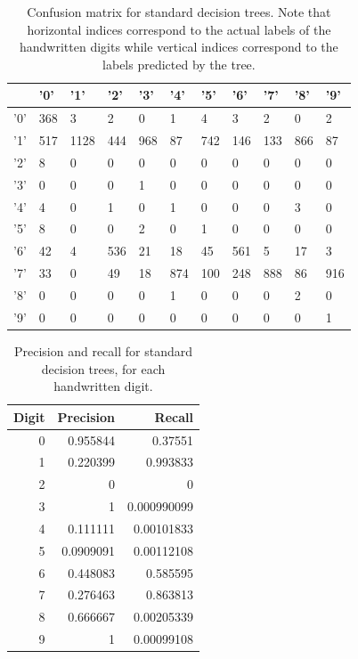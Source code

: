 \begin{table}
	\begin{tabular}{l|llllllllll}
		&   '0' &   '1' &   '2' &   '3' &   '4' &   '5' &   '6' &   '7' &   '8' &   '9' \\
		\hline
		'0' &   368 &     3 &     2 &     0 &     1 &     4 &     3 &     2 &     0 &     2 \\
		'1' &   517 &  1128 &   444 &   968 &    87 &   742 &   146 &   133 &   866 &    87 \\
		'2' &     8 &     0 &     0 &     0 &     0 &     0 &     0 &     0 &     0 &     0 \\
		'3' &     0 &     0 &     0 &     1 &     0 &     0 &     0 &     0 &     0 &     0 \\
		'4' &     4 &     0 &     1 &     0 &     1 &     0 &     0 &     0 &     3 &     0 \\
		'5' &     8 &     0 &     0 &     2 &     0 &     1 &     0 &     0 &     0 &     0 \\
		'6' &    42 &     4 &   536 &    21 &    18 &    45 &   561 &     5 &    17 &     3 \\
		'7' &    33 &     0 &    49 &    18 &   874 &   100 &   248 &   888 &    86 &   916 \\
		'8' &     0 &     0 &     0 &     0 &     1 &     0 &     0 &     0 &     2 &     0 \\
		'9' &     0 &     0 &     0 &     0 &     0 &     0 &     0 &     0 &     0 &     1 \\
	\end{tabular}
	\caption{Confusion matrix for standard decision trees.  Note that horizontal indices correspond to the actual labels of the handwritten digits while vertical indices correspond to the labels predicted by the tree.}
	\label{table:no_kd_confusion}
\end{table}

\begin{table}
	\centering
	\begin{tabular}{rrr}
		Digit &   Precision &      Recall \\
		\hline
		0 &   0.955844  & 0.37551     \\
		1 &   0.220399  & 0.993833    \\
		2 &   0         & 0           \\
		3 &   1         & 0.000990099 \\
		4 &   0.111111  & 0.00101833  \\
		5 &   0.0909091 & 0.00112108  \\
		6 &   0.448083  & 0.585595    \\
		7 &   0.276463  & 0.863813    \\
		8 &   0.666667  & 0.00205339  \\
		9 &   1         & 0.00099108  \\
	\end{tabular}
	\caption{Precision and recall for standard decision trees, for each handwritten digit.}
	\label{table:no_kd_precision_recall}
\end{table}

